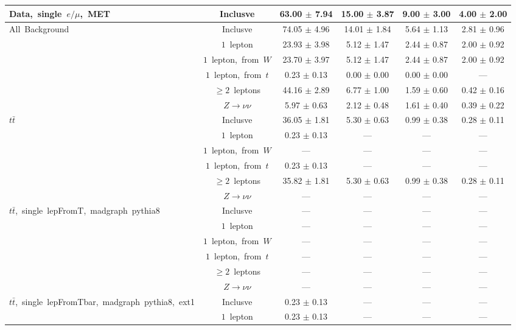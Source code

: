 \documentclass{article}
\begin{document}
\begin{longtable}{|l|c|c|c|c|c|}
\multirow{1}{*}{Data,~single~$e/\mu$,~MET} & Inclusve  & 63.00 $\pm$ 7.94  & 15.00 $\pm$ 3.87  & 9.00 $\pm$ 3.00  & 4.00 $\pm$ 2.00 \\* 
\hline \hline 
\multirow{6}{*}{All~Background} & Inclusve  & 74.05 $\pm$ 4.96  & 14.01 $\pm$ 1.84  & 5.64 $\pm$ 1.13  & 2.81 $\pm$ 0.96 \\* 
 & $1$~lepton  & 23.93 $\pm$ 3.98  & 5.12 $\pm$ 1.47  & 2.44 $\pm$ 0.87  & 2.00 $\pm$ 0.92 \\* 
 & $1$~lepton,~from~$W$  & 23.70 $\pm$ 3.97  & 5.12 $\pm$ 1.47  & 2.44 $\pm$ 0.87  & 2.00 $\pm$ 0.92 \\* 
 & $1$~lepton,~from~$t$  & 0.23 $\pm$ 0.13  & 0.00 $\pm$ 0.00  & 0.00 $\pm$ 0.00  & --- \\* 
 & $\ge2$~leptons  & 44.16 $\pm$ 2.89  & 6.77 $\pm$ 1.00  & 1.59 $\pm$ 0.60  & 0.42 $\pm$ 0.16 \\* 
 & $Z\rightarrow\nu\nu$  & 5.97 $\pm$ 0.63  & 2.12 $\pm$ 0.48  & 1.61 $\pm$ 0.40  & 0.39 $\pm$ 0.22 \\* 
\hline 
\multirow{6}{*}{$t\bar{t}$} & Inclusve  & 36.05 $\pm$ 1.81  & 5.30 $\pm$ 0.63  & 0.99 $\pm$ 0.38  & 0.28 $\pm$ 0.11 \\* 
 & $1$~lepton  & 0.23 $\pm$ 0.13  & ---  & ---  & --- \\* 
 & $1$~lepton,~from~$W$  & ---  & ---  & ---  & --- \\* 
 & $1$~lepton,~from~$t$  & 0.23 $\pm$ 0.13  & ---  & ---  & --- \\* 
 & $\ge2$~leptons  & 35.82 $\pm$ 1.81  & 5.30 $\pm$ 0.63  & 0.99 $\pm$ 0.38  & 0.28 $\pm$ 0.11 \\* 
 & $Z\rightarrow\nu\nu$  & ---  & ---  & ---  & --- \\* 
\hline 
\multirow{6}{*}{$t\bar{t}$,~single~lepFromT,~madgraph~pythia8} & Inclusve  & ---  & ---  & ---  & --- \\* 
 & $1$~lepton  & ---  & ---  & ---  & --- \\* 
 & $1$~lepton,~from~$W$  & ---  & ---  & ---  & --- \\* 
 & $1$~lepton,~from~$t$  & ---  & ---  & ---  & --- \\* 
 & $\ge2$~leptons  & ---  & ---  & ---  & --- \\* 
 & $Z\rightarrow\nu\nu$  & ---  & ---  & ---  & --- \\* 
\hline 
\multirow{6}{*}{$t\bar{t}$,~single~lepFromTbar,~madgraph~pythia8,~ext1} & Inclusve  & 0.23 $\pm$ 0.13  & ---  & ---  & --- \\* 
 & $1$~lepton  & 0.23 $\pm$ 0.13  & ---  & ---  & --- \\* 

\end{longtable}
\end{document}
